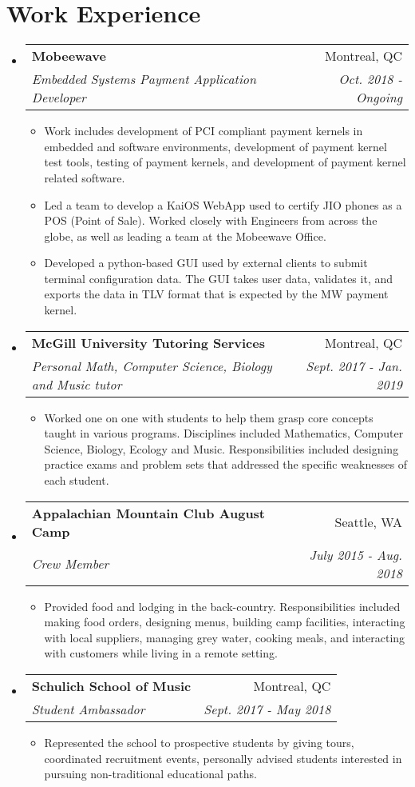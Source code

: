 \documentclass[letterpaper,11pt]{article}
\makeatletter
\newcommand{\resitem}[1]{\item #1 \vspace{-2pt}}
\newcommand{\ressubheading}[4]{
\begin{tabular*}{6.1in}{l@{\extracolsep{\fill}}r}
		\textbf{#1} & #2 \\
		\textit{#3} & \textit{#4} \\
\end{tabular*}\vspace{-1pt}}
\makeatother
\begin{document}
\section*{Work Experience}
\begin{itemize}
\item
	\ressubheading{Mobeewave}{Montreal, QC}{Embedded Systems Payment Application Developer}{Oct. 2018 - Ongoing}
	\begin{itemize}
		\resitem{Work includes development of PCI compliant payment kernels in embedded and software environments, development of payment kernel test tools, testing of payment kernels, and development of payment kernel related software.}
		\resitem{Led a team to develop a KaiOS WebApp used to certify JIO phones as a POS (Point of Sale). Worked closely with Engineers from across the globe, as well as leading a team at the Mobeewave Office.}
		\resitem{Developed a python-based GUI used by external clients to submit terminal configuration data. The GUI takes user data, validates it, and exports the data in TLV format that is expected by the MW payment kernel.}
	\end{itemize}
	
\item
	\ressubheading{McGill University Tutoring Services}{Montreal, QC}{Personal Math, Computer Science, Biology and Music tutor}{Sept. 2017 - Jan. 2019}
	\begin{itemize}
		\resitem{Worked one on one with students to help them grasp core concepts taught in various programs. Disciplines included Mathematics, Computer Science, Biology, Ecology and Music. Responsibilities included designing practice exams and problem sets that addressed the specific weaknesses of each student.}
	\end{itemize}

\item 
	\ressubheading{Appalachian Mountain Club August Camp}{Seattle, WA}{Crew Member}{July 2015 - Aug. 2018}
	\begin{itemize}
		\resitem{Provided food and lodging in the back-country. Responsibilities included making food orders, designing menus, building camp facilities, interacting with local suppliers, managing grey water, cooking meals, and interacting with customers while living in a remote setting.}
	\end{itemize}

\item
	\ressubheading{Schulich School of Music}{Montreal, QC}{Student Ambassador}{Sept. 2017 - May 2018}
	\begin{itemize}
		\resitem{Represented the school to prospective students by giving tours, coordinated recruitment events, personally advised students interested in pursuing non-traditional educational paths.}
	\end{itemize}


\end{itemize}
\end{document}
